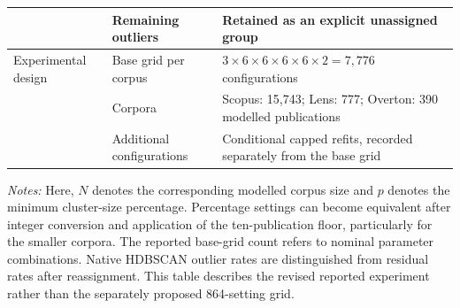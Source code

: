 \documentclass[a4paper,fleqn]{cas-sc}
\begin{document}
\begin{table}[htbp]
\begin{tabularx}{\textwidth}{p{27mm}p{38mm}X}
& Remaining outliers & Retained as an explicit unassigned group \\
\midrule
Experimental design & Base grid per corpus & $3\times6\times6\times6\times6\times2=7{,}776$ configurations \\
& Corpora & Scopus: 15,743; Lens: 777; Overton: 390 modelled publications \\
& Additional configurations & Conditional capped refits, recorded separately from the base grid \\
\bottomrule
\end{tabularx}
\vspace{2mm}
\begin{minipage}{\textwidth}
\footnotesize
\textit{Notes:} Here, $N$ denotes the corresponding modelled corpus size and $p$ denotes the minimum cluster-size percentage. Percentage settings can become equivalent after integer conversion and application of the ten-publication floor, particularly for the smaller corpora. The reported base-grid count refers to nominal parameter combinations. Native HDBSCAN outlier rates are distinguished from residual rates after reassignment. This table describes the revised reported experiment rather than the separately proposed 864-setting grid.
\end{minipage}
\end{table}
\end{document}
